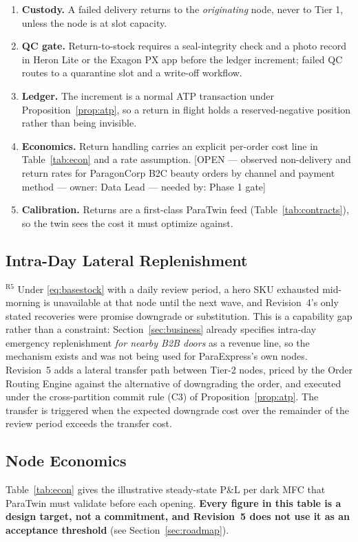 \documentclass[10pt,twocolumn,letterpaper]{article}
\theoremstyle{definition}
\newcommand{\OPEN}[3]{{\color{openred}\footnotesize\textsf{[OPEN --- #1 --- owner: #2 --- needed by: #3]}}}
\begin{document}
\begin{enumerate}
\item \textbf{Custody.} A failed delivery returns to the \emph{originating} node, never to Tier 1, unless the node is at slot capacity.
\item \textbf{QC gate.} Return-to-stock requires a seal-integrity check and a photo record in Heron Lite or the Exagon PX app before the ledger increment; failed QC routes to a quarantine slot and a write-off workflow.
\item \textbf{Ledger.} The increment is a normal ATP transaction under Proposition~\ref{prop:atp}, so a return in flight holds a reserved-negative position rather than being invisible.
\item \textbf{Economics.} Return handling carries an explicit per-order cost line in Table~\ref{tab:econ} and a rate assumption. \OPEN{observed non-delivery and return rates for ParagonCorp B2C beauty orders by channel and payment method}{Data Lead}{Phase 1 gate}
\item \textbf{Calibration.} Returns are a first-class ParaTwin feed (Table~\ref{tab:contracts}), so the twin sees the cost it must optimize against.
\end{enumerate}

\subsection{Intra-Day Lateral Replenishment}\label{sec:lateral}
$^{\mathrm{R5}}$ Under \eqref{eq:basestock} with a daily review period, a hero SKU exhausted mid-morning is unavailable at that node until the next wave, and Revision~4's only stated recoveries were promise downgrade or substitution. This is a capability gap rather than a constraint: Section~\ref{sec:business} already specifies intra-day emergency replenishment \emph{for nearby B2B doors} as a revenue line, so the mechanism exists and was not being used for ParaExpress's own nodes. Revision~5 adds a lateral transfer path between Tier-2 nodes, priced by the Order Routing Engine against the alternative of downgrading the order, and executed under the cross-partition commit rule (C3) of Proposition~\ref{prop:atp}. The transfer is triggered when the expected downgrade cost over the remainder of the review period exceeds the transfer cost.

\subsection{Node Economics}
Table~\ref{tab:econ} gives the illustrative steady-state P\&L per dark MFC that ParaTwin must validate before each opening. \textbf{Every figure in this table is a design target, not a commitment, and Revision~5 does not use it as an acceptance threshold} (see Section~\ref{sec:roadmap}).
\end{document}
